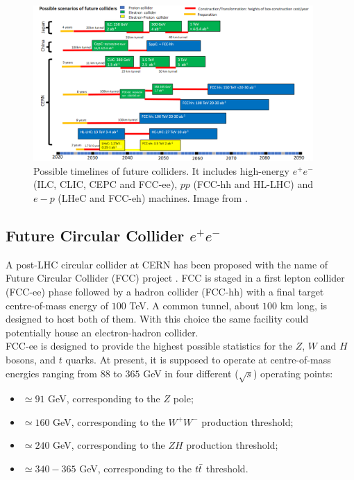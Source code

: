 \begin{figure}
	\includegraphics[width = 0.95\textwidth]{IMG/Cap1/Roadmap.png}
	\caption{Possible  timelines  of  future  colliders.  It includes high-energy $e^+e^-$ (ILC,  CLIC,  CEPC  and  FCC-ee), $pp$ (FCC-hh  and HL-LHC) and $e-p$ (LHeC and FCC-eh) machines. Image from \cite{roadmap}.}
	\label{fig:roadmap}
\end{figure}

\subsection*{Future Circular Collider $e^+e^-$}
A post-LHC circular collider at CERN has been proposed with the name of Future Circular Collider (FCC) project \cite{FCC}. FCC is staged in a first lepton collider (FCC-ee) \cite{FCC-ee} phase followed by a hadron collider (FCC-hh) \cite{FCC-hh} with a final target centre-of-mass energy of $100$ TeV. A common tunnel, about $100$ km long, is designed to host both of them. With this choice the same facility could potentially house an electron-hadron collider.\\
FCC-ee is designed to provide the highest possible statistics for the $Z$, $W$ and $H$ bosons, and $t$ quarks. At present, it is supposed to operate at centre-of-mass energies ranging from $88$ to $365$ GeV in four different ($\sqrt{s}$) operating points:
\begin{itemize}
    \item $\simeq 91$ GeV, corresponding to the $Z$ pole;
    \item $\simeq 160$ GeV, corresponding to the $W^+W^-$ production threshold;
    \item $\simeq 240$ GeV, corresponding to the $ZH$ production threshold;
    \item $\simeq 340-365$ GeV, corresponding to the $t\Bar{t}$ threshold.
\end{itemize}

